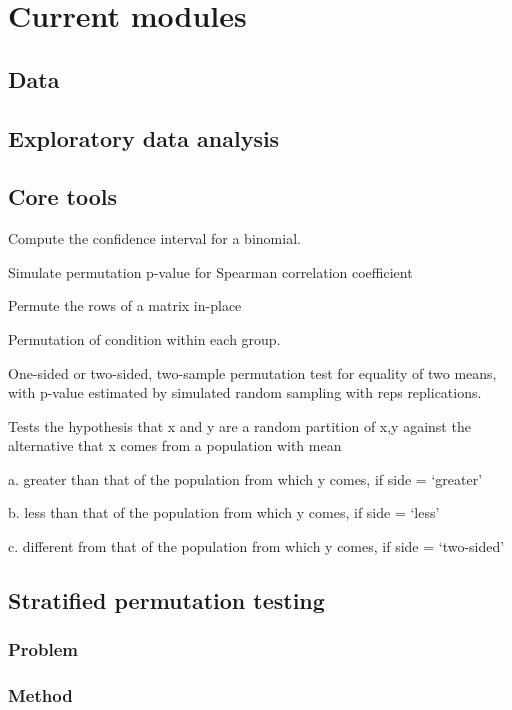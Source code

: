 \chapter{Current modules}

\section{Data}

\section{Exploratory data analysis}

\section{Core tools}

Compute the confidence interval for a binomial.

Simulate permutation p-value for Spearman correlation coefficient

Permute the rows of a matrix in-place

Permutation of condition within each group.

One-sided or two-sided, two-sample permutation test for equality of two means,
with p-value estimated by simulated random sampling with reps replications.

Tests the hypothesis that x and y are a random partition of x,y against the
alternative that x comes from a population with mean

a. greater than that of the population from which y comes, if side = ‘greater’

b. less than that of the population from which y comes, if side = ‘less’

c. different from that of the population from which y comes, if side = ‘two-sided’

\section{Stratified permutation testing}

\subsection{Problem}

\subsection{Method}

